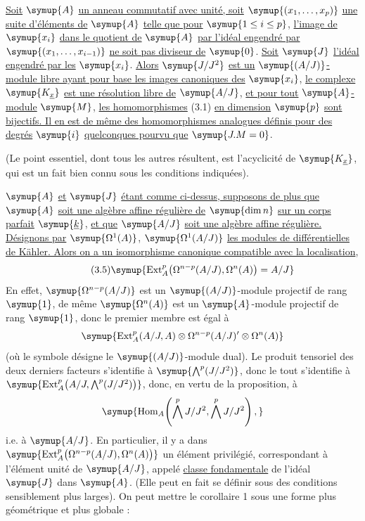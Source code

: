  \uline{Soit} $\symup{A}$ \uline{un anneau commutatif avec unité, soit}
$\symup{(x_1,\ldots,x_p)}$ \uline{une suite d'éléments de} $\symup{A}$ \uline{telle que pour} $\symup{1\leq i\leq p}$,
\uline{l'image de} $\symup{x_i}$ \uline{dans le quotient de} $\symup{A}$ \uline{par l'idéal engendré par}
$\symup{(x_1,\ldots,x_{i-1})}$ \uline{ne soit pas diviseur de} $\symup{0}$. \uline{Soit} $\symup{J}$ \uline{l'idéal engendré
par les} $\symup{x_i}$. \uline{Alors} $\symup{J/J^{2}}$ \uline{est un} $\symup{(A/J)}$\uline{-module libre ayant pour base les
images canoniques des} $\symup{x_i}$, \uline{le complexe} $\symup{K_{\underline{x}}}$ \uline{est une résolution
libre de} $\symup{A/J}$, \uline{et pour tout} $\symup{A}$\uline{-module} $\symup{M}$, \uline{les homomorphismes} (3.1) \uline{en
dimension} $\symup{p}$ \uline{sont bijectifs. Il en est de même des homomorphismes analogues
définis pour des degrés} $\symup{i}$ \uline{quelconques pourvu que} $\symup{J.M=0}$.

(Le point essentiel, dont tous les autres résultent, est l'acyclicité de
$\symup{K_{\underline{x}}}$, qui est un fait bien connu sous les conditions indiquées).

 $\symup{A}$ \uline{et} $\symup{J}$ \uline{étant comme ci-dessus, supposons de plus que}
$\symup{A}$ \uline{soit une algèbre affine régulière de} $\symup{\dim n}$ \uline{sur un corps parfait} $\symup{\underline{k}}$, \uline{et
que} $\symup{A/J}$ \uline{soit une algèbre affine régulière. Désignons par} $\symup{\Omega^{1}(A)}$,
$\symup{\Omega^{1}(A/J)}$ \uline{les modules de différentielles de Kähler. Alors on a un
isomorphisme canonique compatible avec la localisation},
\begin{equation}\tag{3.5}
  \symup{\operatorname{Ext}_{A}^{p}\bigl(\Omega^{n-p}(A/J),\Omega^{n}(A)\bigr)=A/J}
\end{equation}
En effet, $\symup{\Omega^{n-p}(A/J)}$ est un $\symup{(A/J)}$-module projectif de rang $\symup{1}$, de même
$\symup{\Omega^{n}(A)}$ est un $\symup{A}$-module projectif de rang $\symup{1}$,
donc le premier membre est égal à
\[
  \symup{\operatorname{Ext}_{A}^{p}(A/J,A)
  \otimes\Omega^{n-p}(A/J)'\otimes\Omega^{n}(A)}
\]
(où le symbole \fquote{$\symup{\prime}$} désigne le $\symup{(A/J)}$-module dual). Le produit tensoriel des
deux derniers facteurs s'identifie à $\symup{\bigwedge^{p}(J/J^{2})}$, donc le tout
s'identifie à
$\symup{\operatorname{Ext}_{A}^{p}\!\left(A/J,\bigwedge^{p}(J/J^{2})\right)}$,
donc, en vertu de la proposition, à
\[
  \symup{\operatorname{Hom}_{A}\!\left(\bigwedge^{p}J/J^{2},
  \bigwedge^{p}J/J^{2}\right),}
\]
i.e. à $\symup{A/J}$. En particulier, il y a dans
$\symup{\operatorname{Ext}_{A}^{p}\bigl(\Omega^{n-p}(A/J),\Omega^{n}(A)\bigr)}$ un
élément privilégié, correspondant à l'élément unité de $\symup{A/J}$, appelé
\uline{classe fondamentale} de l'idéal $\symup{J}$ dans $\symup{A}$. (Elle peut en fait se
définir sous des conditions sensiblement plus larges). On peut mettre le
corollaire 1 sous une forme plus géométrique et plus globale :

